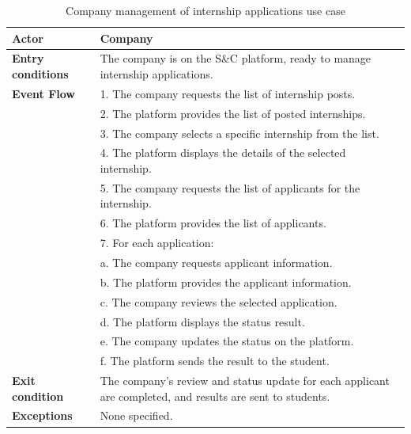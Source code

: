 \begin{table}[h!]
    \centering
    \begin{tabular}{lp{10cm}}
        \textbf{Actor} & Company \\ \hline
        \textbf{Entry conditions} & The company is on the S\&C platform, ready to manage internship applications. \\ \hline
        \textbf{Event Flow} & 
        1. The company requests the list of internship posts. \\
        & 2. The platform provides the list of posted internships. \\
        & 3. The company selects a specific internship from the list. \\
        & 4. The platform displays the details of the selected internship. \\
        & 5. The company requests the list of applicants for the internship. \\
        & 6. The platform provides the list of applicants. \\
        & 7. For each application: \\
        & \quad a. The company requests applicant information. \\
        & \quad b. The platform provides the applicant information. \\
        & \quad c. The company reviews the selected application. \\
        & \quad d. The platform displays the status result. \\
        & \quad e. The company updates the status on the platform. \\
        & \quad f. The platform sends the result to the student. \\
        \hline
        \textbf{Exit condition} & The company's review and status update for each applicant are completed, and results are sent to students. \\ \hline
        \textbf{Exceptions} & None specified. \\
    \end{tabular}
    \caption{Company management of internship applications use case}
    \label{tab:company_manage_internship_applications}
\end{table}


